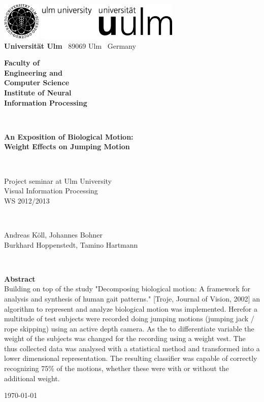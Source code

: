 \documentclass[a4paper]{article}
\begin{document}
\begin{titlepage}
\thispagestyle{empty}


\includegraphics[height=1.8cm]{unilogo_bild}
\hfill
\includegraphics[height=1.8cm]{unilogo_wort}\\[1em]


{\bfseries Universität Ulm} \textbar ~89069 Ulm \textbar ~Germany
\hspace*{38mm}\parbox[t]{38mm}{\bfseries Faculty of \\ Engineering and\\Computer Science\\
\mdseries Institute of Neural\\Information Processing}\\[2cm]

\parbox{140mm}{\bfseries \huge An Exposition of Biological Motion:\\ Weight Effects on Jumping Motion}\\[0.5em]

\parbox{140mm}{Project seminar at Ulm University\\Visual Information Processing \\ WS 2012/2013}\\[3em]

\parbox{140mm}{Andreas Köll, Johannes Bohner \\ Burkhard Hoppenstedt, Tamino Hartmann}\\[4em]



\parbox{140mm}{
{\bfseries\large Abstract}\\
Building on top of the study "Decomposing biological motion: A framework for analysis and synthesis of human gait patterns." [Troje, Journal of Vision, 2002] an algorithm to represent and analyze biological motion was implemented.
Herefor a multitude of test subjects were recorded doing jumping motions (jumping jack / rope skipping) using an active depth camera.
As the to differentiate variable the weight of the subjects was changed for the recording using a weight vest.
The thus collected data was analysed with a statistical method and transformed into a lower dimensional representation.
The resulting classifier was capable of correctly recognizing 75\% of the motions, whether these were with or without the additional weight.
}
\vfill

\parbox{140mm}{\today}



\end{titlepage}
\end{document}
